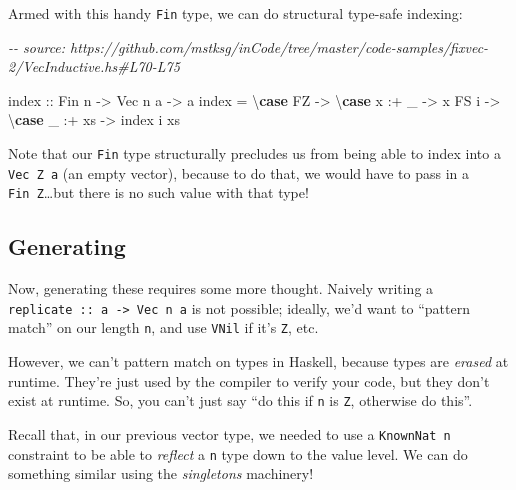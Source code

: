 \documentclass[]{article}
\newenvironment{Shaded}{}{}
\newcommand{\CommentTok}[1]{\textcolor[rgb]{0.38,0.63,0.69}{\textit{#1}}}
\newcommand{\DataTypeTok}[1]{\textcolor[rgb]{0.56,0.13,0.00}{#1}}
\newcommand{\FunctionTok}[1]{\textcolor[rgb]{0.02,0.16,0.49}{#1}}
\newcommand{\KeywordTok}[1]{\textcolor[rgb]{0.00,0.44,0.13}{\textbf{#1}}}
\newcommand{\NormalTok}[1]{#1}
\newcommand{\OperatorTok}[1]{\textcolor[rgb]{0.40,0.40,0.40}{#1}}
\newcommand{\OtherTok}[1]{\textcolor[rgb]{0.00,0.44,0.13}{#1}}
\begin{document}
Armed with this handy \texttt{Fin} type, we can do structural type-safe
indexing:

\begin{Shaded}
\begin{Highlighting}[]
\CommentTok{{-}{-} source: https://github.com/mstksg/inCode/tree/master/code{-}samples/fixvec{-}2/VecInductive.hs\#L70{-}L75}

\FunctionTok{index}\OtherTok{ ::} \DataTypeTok{Fin}\NormalTok{ n }\OtherTok{{-}>} \DataTypeTok{Vec}\NormalTok{ n a }\OtherTok{{-}>}\NormalTok{ a}
\FunctionTok{index} \OtherTok{=}\NormalTok{ \textbackslash{}}\KeywordTok{case}
    \DataTypeTok{FZ} \OtherTok{{-}>}\NormalTok{ \textbackslash{}}\KeywordTok{case}
\NormalTok{      x }\OperatorTok{:+}\NormalTok{ \_ }\OtherTok{{-}>}\NormalTok{ x}
    \DataTypeTok{FS}\NormalTok{ i }\OtherTok{{-}>}\NormalTok{ \textbackslash{}}\KeywordTok{case}
\NormalTok{      \_ }\OperatorTok{:+}\NormalTok{ xs }\OtherTok{{-}>} \FunctionTok{index}\NormalTok{ i xs}
\end{Highlighting}
\end{Shaded}

Note that our \texttt{Fin} type structurally precludes us from being able to
index into a \texttt{Vec\ \textquotesingle{}Z\ a} (an empty vector), because to
do that, we would have to pass in a \texttt{Fin\ \textquotesingle{}Z}\ldots but
there is no such value with that type!

\hypertarget{generating-1}{%
\subsection{Generating}\label{generating-1}}

Now, generating these requires some more thought. Naively writing a
\texttt{replicate\ ::\ a\ -\textgreater{}\ Vec\ n\ a} is not possible; ideally,
we'd want to ``pattern match'' on our length \texttt{n}, and use \texttt{VNil}
if it's \texttt{\textquotesingle{}Z}, etc.

However, we can't pattern match on types in Haskell, because types are
\emph{erased} at runtime. They're just used by the compiler to verify your code,
but they don't exist at runtime. So, you can't just say ``do this if \texttt{n}
is \texttt{\textquotesingle{}Z}, otherwise do this''.

Recall that, in our previous vector type, we needed to use a
\texttt{KnownNat\ n} constraint to be able to \emph{reflect} a \texttt{n} type
down to the value level. We can do something similar using the \emph{singletons}
machinery!
\end{document}
